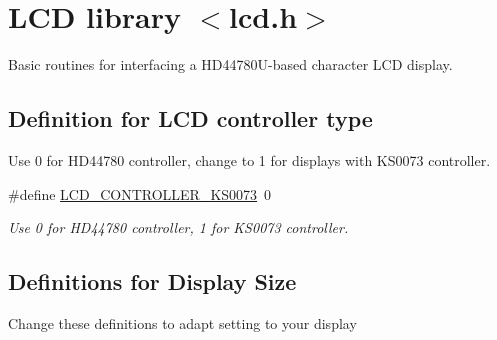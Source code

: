 \hypertarget{group__pfleury__lcd}{}\section{L\+CD library $<$lcd.\+h$>$}
\label{group__pfleury__lcd}


Basic routines for interfacing a H\+D44780\+U-\/based character L\+CD display.  


\subsection*{Definition for L\+CD controller type}
\label{_amgrp9cebaa2a52e46760a474a1905c7f53a9}%
Use 0 for H\+D44780 controller, change to 1 for displays with K\+S0073 controller. \begin{DoxyCompactItemize}
\item 
\#define \hyperlink{group__pfleury__lcd_ga63574b03f72a197aeee823aae95dc3b7}{L\+C\+D\+\_\+\+C\+O\+N\+T\+R\+O\+L\+L\+E\+R\+\_\+\+K\+S0073}~0\hypertarget{group__pfleury__lcd_ga63574b03f72a197aeee823aae95dc3b7}{}\label{group__pfleury__lcd_ga63574b03f72a197aeee823aae95dc3b7}

\begin{DoxyCompactList}\small\item\em Use 0 for H\+D44780 controller, 1 for K\+S0073 controller. \end{DoxyCompactList}\end{DoxyCompactItemize}
\subsection*{Definitions for Display Size}
\label{_amgrpcaec0cb1262819d89ffa7f25526cc869}%
Change these definitions to adapt setting to your display

